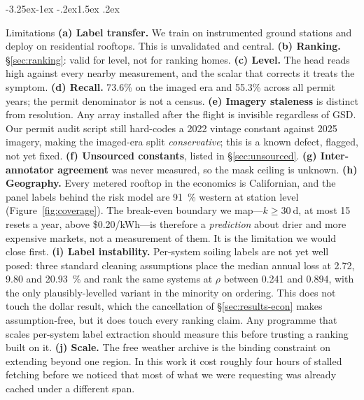 \documentclass[10pt,twocolumn]{article}
\makeatletter
\renewcommand\subsection{\@startsection{subsection}{2}{\z@}%
  {-3.25ex\@plus -1ex \@minus -.2ex}{1.5ex \@plus .2ex}%
  {\normalfont\large\bfseries\raggedright}}
\makeatother
\begin{document}
\subsection{Limitations}
\label{sec:limitations}
\textbf{(a) Label transfer.} We train on instrumented ground stations and deploy on
residential rooftops. This is unvalidated and central.
\textbf{(b) Ranking.} \S\ref{sec:ranking}: valid for level, not for ranking homes.
\textbf{(c) Level.} The head reads high against every nearby measurement, and the scalar
that corrects it treats the symptom.
\textbf{(d) Recall.} 73.6\% on the imaged era and 55.3\% across all permit years; the
permit denominator is not a census.
\textbf{(e) Imagery staleness} is distinct from resolution. Any array installed after the
flight is invisible regardless of GSD. Our permit audit script still hard-codes a 2022
vintage constant against 2025 imagery, making the imaged-era split \emph{conservative};
this is a known defect, flagged, not yet fixed.
\textbf{(f) Unsourced constants}, listed in \S\ref{sec:unsourced}.
\textbf{(g) Inter-annotator agreement} was never measured, so the mask ceiling is unknown.
\textbf{(h) Geography.} Every metered rooftop in the economics is Californian, and the
panel labels behind the risk model are \SI{91}{\percent} western at station level
(Figure~\ref{fig:coverage}). The break-even boundary we map---$k\geq\SI{30}{\day}$, at
most 15 resets a year, above \$0.20/kWh---is therefore a \emph{prediction} about drier and
more expensive markets, not a measurement of them. It is the limitation we would close
first.
\textbf{(i) Label instability.} Per-system soiling labels are not yet well posed: three
standard cleaning assumptions place the median annual loss at 2.72, 9.80 and
\SI{20.93}{\percent} and rank the same systems at $\rho$ between 0.241 and 0.894, with the
only plausibly-levelled variant in the minority on ordering. This does not touch the dollar
result, which the cancellation of \S\ref{sec:results-econ} makes assumption-free, but it
does touch every ranking claim. Any programme that scales per-system label extraction should measure this before
trusting a ranking built on it.
\textbf{(j) Scale.} The free weather archive is the binding constraint on extending beyond
one region. In this work it cost roughly four hours of stalled fetching before we noticed
that most of what we were requesting was already cached under a different span.
\end{document}
